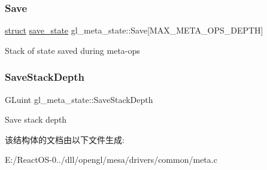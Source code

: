 \subsubsection{\texorpdfstring{Save}{Save}}
{\footnotesize\ttfamily \hyperlink{interfacestruct}{struct} \hyperlink{structsave__state}{save\+\_\+state} gl\+\_\+meta\+\_\+state\+::\+Save\mbox{[}M\+A\+X\+\_\+\+M\+E\+T\+A\+\_\+\+O\+P\+S\+\_\+\+D\+E\+P\+TH\mbox{]}}

Stack of state saved during meta-\/ops \mbox{\label{structgl__meta__state_a8b77c311b5a78255d6b7611ba5072016}} 
\subsubsection{\texorpdfstring{Save\+Stack\+Depth}{SaveStackDepth}}
{\footnotesize\ttfamily G\+Luint gl\+\_\+meta\+\_\+state\+::\+Save\+Stack\+Depth}

Save stack depth 

该结构体的文档由以下文件生成\+:\begin{DoxyCompactItemize}
\item 
E\+:/\+React\+O\+S-\/0../dll/opengl/mesa/drivers/common/meta.\+c\end{DoxyCompactItemize}
